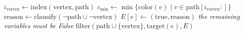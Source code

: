 
\begin{algorithm}[H]
    \caption{Cycle Close}
    \begin{algorithmic}[1]
            \State $i_{\text{vertex}} \gets \text{index}(\text{vertex}, \text{path})$
            \State $c_{\text{min}} \gets \min\{\text{color}(v) \mid v \in \text{path}[i_{\text{vertex}}:]\}$
                \State $\text{reason} \gets \text{clausify}(\neg \text{path} \cup \neg \text{vertex})$
                \State $E[e] \gets (\text{true}, \text{reason})$
                \State \textit{the remaining variables must be False}
            \EndIf
        \Else
                \State $\text{filter}(\text{path} \cup \{\text{vertex}\}, \text{target}(e), E)$
            \EndFor
        \EndIf
    \EndFunction
    \end{algorithmic}
    \label{alg:cycle-close}
\end{algorithm}